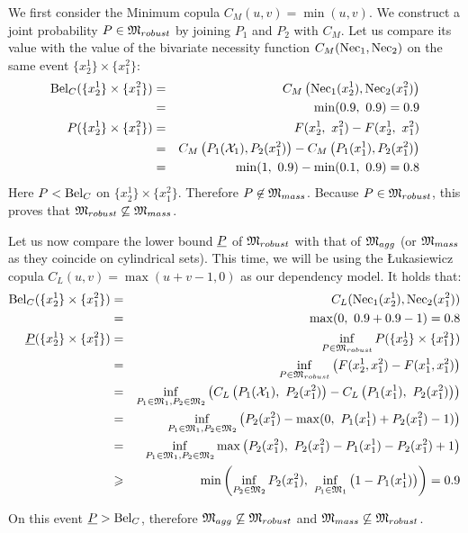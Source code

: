\begin{example}
    
    We first consider the Minimum copula $C_M(u,v)=\min(u,v)$. We construct a joint probability $P\in\mathfrak{M}_{robust}$ by joining $P_1$ and $P_2$ with $C_M$. Let us compare its value with the value of the bivariate necessity function $C_M(\mathrm{Nec}_1, \mathrm{Nec}_2)$ on the same event $\{x^1_2\}\times\{x^2_1\}$:
    \begin{eqnarray*}
        \mathrm{Bel}_C(\{x^1_2\}\times\{x^2_1\}) &=& C_M\left(\mathrm{Nec}_1(x^1_2), \mathrm{Nec}_2(x^2_1)\right)\\
        &=& \min(0.9,~0.9) = 0.9\\
        P(\{x^1_2\}\times\{x^2_1\}) &=& F(x^1_2,~x^2_1)-F(x^1_2,~x^2_1)\\
        &=& C_M\left(P_1(\mathcal{X}_1), P_2(x^2_1)\right) - C_M\left(P_1(x^1_1),P_2(x^2_1)\right)\\
        &=& \min(1,~0.9) - \min(0.1,~0.9) = 0.8
    \end{eqnarray*}
    Here $P<\mathrm{Bel}_C$ on $\{x^1_2\}\times\{x^2_1\}$.
    Therefore $P\not\in\mathfrak{M}_{mass}$. Because $P\in\mathfrak{M}_{robust}$, this proves that $\mathfrak{M}_{robust}\not\subseteq\mathfrak{M}_{mass}$.
    
    Let us now compare the lower bound $\underline{P}$ of $\mathfrak{M}_{robust}$ with that of $\mathfrak{M}_{agg}$ (or $\mathfrak{M}_{mass}$ as they coincide on cylindrical sets). This time, we will be using the \L ukasiewicz copula $C_L(u,v)=\max(u+v-1,0)$ as our dependency model. It holds that:
    \begin{eqnarray*}
        \mathrm{Bel}_C(\{x^1_2\}\times\{x^2_1\}) &=& C_L(\mathrm{Nec}_1(x^1_2), \mathrm{Nec}_2(x^2_1))\\
        &=& \max(0,~0.9 + 0.9 - 1) = 0.8\\
        \underline{P}(\{x^1_2\}\times\{x^2_1\}) &=& \inf_{P\in\mathfrak{M}_{robust}}P(\{x^1_2\}\times\{x^2_1\})\\
        &=& \inf_{P\in\mathfrak{M}_{robust}}\left(F(x^1_2,x^2_1) - F(x^1_1,x^2_1)\right)\\
        &=& \inf_{P_1\in\mathfrak{M}_1, P_2\in\mathfrak{M}_2}\left(C_L\left(P_1(\mathcal{X}_1),~P_2(x^2_1)\right)- C_L\left(P_1(x^1_1),~P_2(x^2_1)\right)\right)\\
        &=& \inf_{P_1\in\mathfrak{M}_1, P_2\in\mathfrak{M}_2}\left(P_2(x^2_1) - \max(0,~P_1(x^1_1) + P_2(x^2_1) - 1 )\right)\\
        &=& \inf_{P_1\in\mathfrak{M}_1, P_2\in\mathfrak{M}_2}\max\left(P_2(x^2_1), ~P_2(x^2_1)-P_1(x^1_1) - P_2(x^2_1) + 1 \right)\\
        &\geqslant& \min\left(\inf_{P_2\in\mathfrak{M}_2}P_2(x^2_1),~\inf_{P_1\in\mathfrak{M}_1}\left(1-P_1(x^1_1)\right)\right) = 0.9
    \end{eqnarray*}
    
    On this event $\underline{P}>\mathrm{Bel}_C$, therefore $\mathfrak{M}_{agg}\not\subseteq\mathfrak{M}_{robust}$ and $\mathfrak{M}_{mass}\not\subseteq\mathfrak{M}_{robust}$.
\end{example}

